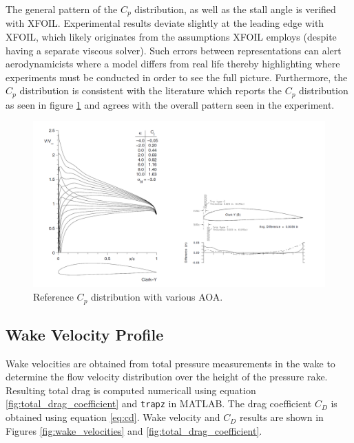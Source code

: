 \documentclass[runningheads]{llncs}
\begin{document}
\noindent
The general pattern of the $C_p$ distribution, as well as the stall angle is verified with XFOIL. Experimental results deviate slightly at the leading edge with XFOIL, which likely originates from the assumptions XFOIL employs (despite having a separate viscous solver). Such errors between representations can alert aerodynamicists where a model differs from real life thereby highlighting where experiments must be conducted in order to see the full picture. Furthermore, the $C_p$ distribution is consistent with the literature\cite{lyon_broeren_giguere_gopalarathnam_selig_1997} which reports the $C_p$ distribution as seen in figure \ref{fig:lit_cp} and agrees with the overall pattern seen in the experiment.

\begin{figure}[h]
    \centering
    \includegraphics[width=\textwidth]{figures/reference_cp.png}
    \caption{Reference $C_p$ distribution with various AOA.}
    \label{fig:lit_cp}
\end{figure}

\subsection{Wake Velocity Profile}

\noindent
Wake velocities are obtained from total pressure measurements in the wake to determine the flow velocity distribution over the height of the pressure rake. Resulting total drag is computed numericall using equation \ref{fig:total_drag_coefficient} and \verb|trapz| in MATLAB. The drag coefficient $C_D$ is obtained using equation \ref{eq:cd}. Wake velocity and $C_D$ results are shown in Figures \ref{fig:wake_velocities} and \ref{fig:total_drag_coefficient}.\newline
\end{document}

